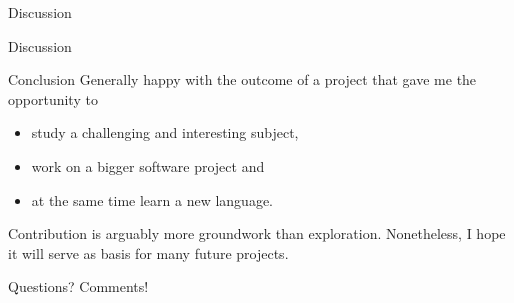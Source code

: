 \documentclass{beamer}
\begin{document}
\begin{section}{Discussion}

	\begin{frame}[t]{Discussion}
		\begin{block}{Conclusion}
			Generally happy with the outcome of a project that gave me the opportunity to 
			\begin{itemize}
				\item study a challenging and interesting subject,
				\item work on a bigger software project and
				\item at the same time learn a new language.
			\end{itemize}
			
			Contribution is arguably more groundwork than exploration. Nonetheless, I hope it will serve as basis for many future projects.
		\end{block}
	\end{frame}


	\begin{frame}{}
		\begin{center}
			\large{Questions? Comments!}
		\end{center}
	\end{frame}

\end{section}
\end{document}
